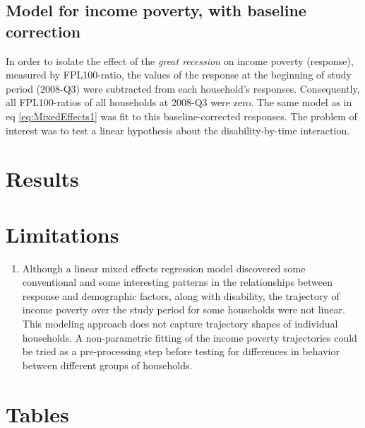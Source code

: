\documentclass[11pt]{extarticle} %
\begin{document}
\subsection{Model for income poverty, with baseline correction}
In order to isolate the effect of the {\emph{great recession}} on income poverty (response), measured by FPL100-ratio, the values of the response at the beginning of study period (2008-Q3) were subtracted from each household's responses. Consequently, all FPL100-ratios of all households at 2008-Q3 were zero. The same model as in eq \ref{eq:MixedEffects1} was fit to this baseline-corrected responses. The problem of interest was to test a linear hypothesis about the disability-by-time interaction. 

\section{Results}


\section{Limitations}
\begin{enumerate}
\item Although a linear mixed effects regression model discovered some conventional and some interesting patterns in the relationships between response and demographic factors, along with disability, the trajectory of income poverty over the study period for some households were not linear. This modeling approach does not capture trajectory shapes of individual households. A non-parametric fitting of the income poverty trajectories could be tried as a pre-processing step before testing for differences in behavior between different groups of households. 
\end{enumerate}

\newpage
\section{Tables}
\end{document}
